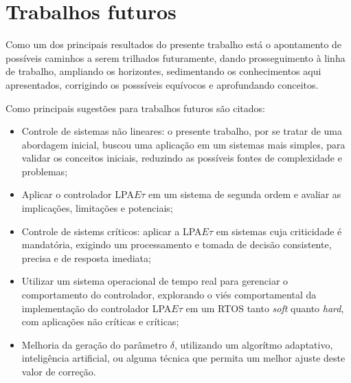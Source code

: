 \section{Trabalhos futuros}

Como um dos principais resultados do presente trabalho está o apontamento de possíveis caminhos a serem trilhados futuramente, dando prosseguimento à linha de trabalho, ampliando os horizontes, sedimentando os conhecimentos aqui apresentados, corrigindo os posssíveis equívocos e aprofundando conceitos.

Como principais sugestões para trabalhos futuros são citados:

\begin{itemize}

\item Controle de sistemas não lineares: o presente trabalho, por se tratar de uma abordagem inicial, buscou uma aplicação em um sistemas mais simples, para validar os conceitos iniciais, reduzindo as possíveis fontes de complexidade e problemas;

\item Aplicar o controlador LPA$E\tau$ em um sistema de segunda ordem e avaliar as implicações, limitações e potenciais;
  
\item Controle de sistems críticos: aplicar a LPA$E\tau$ em sistemas cuja criticidade é mandatória, exigindo um processamento e tomada de decisão consistente, precisa e de resposta imediata;

\item Utilizar um sistema operacional de tempo real para gerenciar o comportamento do controlador, explorando o viés comportamental da implementação do controlador LPA$E\tau$ em um RTOS tanto \emph{soft} quanto \emph{hard}, com aplicações não críticas e críticas;

\item Melhoria da geração do parâmetro $\delta$, utilizando um algorítmo adaptativo, inteligência artificial, ou alguma técnica que permita um melhor ajuste deste valor de correção.
  
\end{itemize}





